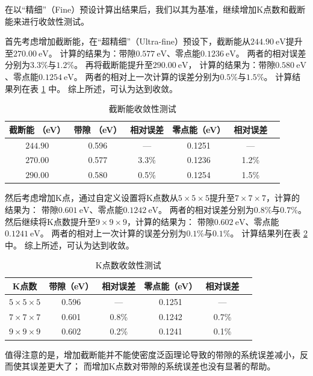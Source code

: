 在以“精细”（Fine）预设计算出结果后，我们以其为基准，继续增加K点数和截断能来进行收敛性测试。

首先考虑增加截断能，在“超精细”（Ultra-fine）预设下，截断能从$\qty{244.90}{\electronvolt}$提升至$\qty{270.00}{\electronvolt}$。
计算的结果为：带隙$\qty{0.577}{\electronvolt}$、零点能$\qty{0.1236}{\electronvolt}$。
两者的相对误差分别为$3.3\%$与$1.2\%$。
再将截断能提升至$\qty{290.00}{\electronvolt}$，
计算的结果为：带隙$\qty{0.580}{\electronvolt}$、零点能$\qty{0.1254}{\electronvolt}$。
两者的相对上一次计算的误差分别为$0.5\%$与$1.5\%$。
计算结果列在表 \ref{tab:convergence-test-encut} 中。
综上所述，可认为达到收敛。

\begin{table}
    \centering
    \caption{截断能收敛性测试}
    \label{tab:convergence-test-encut}
    \begin{tabular}{cccccc}
        \hline
        截断能 （eV） & 带隙 （eV） & 相对误差 & 零点能（eV） & 相对误差 \\ \hline
        $244.90$ & 0.596 & --- & 0.1251 & --- \\
        $270.00$ & 0.577 & 3.3\% & 0.1236 & 1.2\% & \\
        $290.00$ & 0.580 & 0.5\% & 0.1254 & 1.5\% \\ \hline
    \end{tabular}
\end{table}

然后考虑增加K点，通过自定义设置将K点数从$5\times 5 \times 5$提升至$7 \times 7 \times 7$，计算的结果为：
带隙$\qty{0.601}{\electronvolt}$、零点能$\qty{0.1242}{\electronvolt}$。
两者的相对误差分别为$0.8\%$与$0.7\%$。
然后继续将K点数提升至$9 \times 9 \times 9$，计算的结果为：
带隙$\qty{0.602}{\electronvolt}$、零点能$\qty{0.1241}{\electronvolt}$。
两者的相对上一次计算的误差分别为$0.1\%$与$0.1\%$。
计算结果列在表 \ref{tab:convergence-test-kpoints} 中。
综上所述，可认为达到收敛。

\begin{table}
    \centering
    \caption{K点数收敛性测试}
    \label{tab:convergence-test-kpoints}
    \begin{tabular}{cccccc}
        \hline
        K点数 & 带隙（eV） & 相对误差 & 零点能（eV） & 相对误差  \\ \hline
        $5 \times 5 \times 5$ & 0.596 & --- & 0.1251 & --- \\
        $7 \times 7 \times 7$ & 0.601 & 0.8\% & 0.1242 & 0.7\% \\
        $9 \times 9 \times 9$ & 0.602 & 0.2\% & 0.1241 & 0.1\% \\ \hline
    \end{tabular}
\end{table}

值得注意的是，增加截断能并不能使密度泛函理论导致的带隙的系统误差减小，反而使其误差更大了；
而增加K点数对带隙的系统误差也没有显著的帮助。
